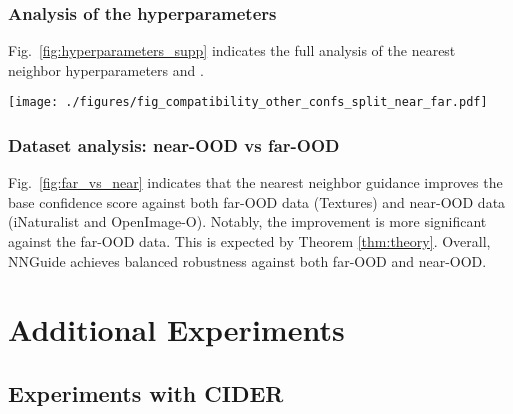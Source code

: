 \documentclass[10pt,twocolumn,letterpaper]{article}
\begin{document}
\subsubsection{Analysis of the hyperparameters}
Fig.~\ref{fig:hyperparameters_supp} indicates the full analysis of the nearest neighbor hyperparameters  and .

\begin{figure*}[t]
\centering
\texttt{[image: ./figures/fig\_compatibility\_other\_confs\_split\_near\_far.pdf]}
\caption{
The improvement by our proposed nearest neighbor guidance against far-OOD data (Textures) and near-OOD data (iNaturalist and OpenImage-O). The ID data is ImageNet-1k and the model is ResNet-50.
}
\label{fig:far_vs_near}
\end{figure*}

\subsubsection{Dataset analysis: near-OOD vs far-OOD}
Fig.~\ref{fig:far_vs_near} indicates that the nearest neighbor guidance improves the base confidence score against both far-OOD data (\ie Textures) and near-OOD data (\ie iNaturalist and OpenImage-O). Notably, the improvement is more significant against the far-OOD data. This is expected by Theorem \ref{thm:theory}. Overall, NNGuide achieves balanced robustness against both far-OOD and near-OOD. 

\section{Additional Experiments}

\subsection{Experiments with CIDER}

\begin{table}[t]
\centering
{}
\caption{
The results of NNGuide with CIDER on CIFAR-100 (ID).
}
\label{table:cider}
\end{table}
\end{document}
